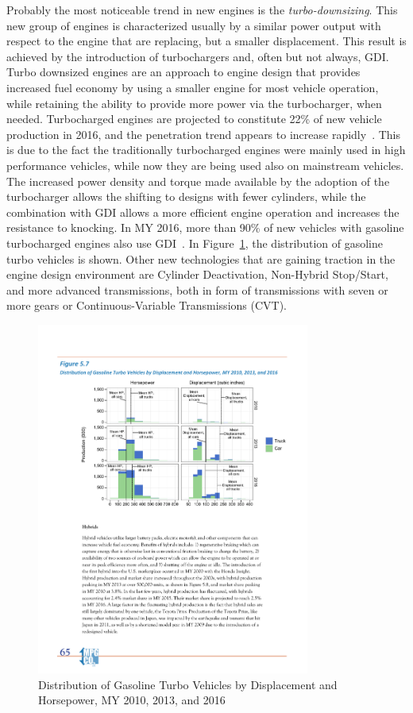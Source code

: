 Probably the most noticeable trend in new engines is the \emph{turbo-downsizing}. This new group of engines is characterized usually by a similar power output with respect to the engine that are replacing, but a smaller displacement. This result is achieved by the introduction of turbochargers and, often but not always, GDI. Turbo downsized engines are an approach to engine design that provides increased fuel economy by using a smaller engine for most vehicle operation, while retaining the ability to provide more power via the turbocharger, when needed. Turbocharged engines are projected to constitute 22\% of new vehicle production in 2016, and the penetration trend appears to increase rapidly~\cite{EPA2016}. This is due to the fact the traditionally turbocharged engines were mainly used in high performance vehicles, while now they are being used also on mainstream vehicles. The increased power density and torque made available by the adoption of the turbocharger allows the shifting to designs with fewer cylinders, while the combination with GDI allows a more efficient engine operation and increases the resistance to knocking. In MY 2016, more than 90\% of new vehicles with gasoline turbocharged engines also use GDI~\cite{EPA2016}. In Figure~\ref{fig:turbodownsizing_distribution}, the distribution of gasoline turbo vehicles is shown. Other new technologies that are gaining traction in the engine design environment are Cylinder Deactivation, Non-Hybrid Stop/Start, and more advanced transmissions, both in form of transmissions with seven or more gears or Continuous-Variable Transmissions (CVT).

\begin{figure}[ht]
  \centering
  \includegraphics[width=0.8\textwidth]{figures/review/turbodownsizing_distribution.pdf}
  \caption{Distribution of Gasoline Turbo Vehicles by Displacement and Horsepower, MY 2010, 2013, and 2016\label{fig:turbodownsizing_distribution} }
\end{figure}



